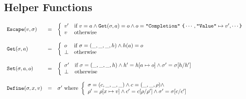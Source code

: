 \newpage


\subsection{Helper Functions}\label{sec:helper}

\[
  \begin{array}{lcl}
    \texttt{Escape}(v, \sigma) &=& \left\{
      \begin{array}{ll}
        v' & \text{if}\
        v = a \wedge
        \texttt{Get}(\sigma, a) = o \wedge
        o = \texttt{"Completion"}\ \texttt{\{} \cdots, \texttt{"Value"} \mapsto v', \cdots \texttt{\}}\\
        v & \text{otherwise}\\
      \end{array}
    \right.\\\\

    \texttt{Get}(\sigma, a) &=& \left\{
      \begin{array}{ll}
        o & \text{if}\
        \sigma = (\_, \_, \_, h) \wedge
        h(a) = o\\
        \bot & \text{otherwise}\\
      \end{array}
    \right.\\\\

    \texttt{Set}(\sigma, a, o) &=& \left\{
      \begin{array}{ll}
        \sigma' & \text{if}\
        \sigma = (\_, \_, \_, h) \wedge
        h' = h[a \mapsto o] \wedge
        \sigma' = \sigma[h / h']\\
        \bot & \text{otherwise}\\
      \end{array}
    \right.\\\\

    \texttt{Define}(\sigma, x, v) &=& \sigma'\ \text{where}\ \left\{
      \begin{array}{ll}
        \sigma = (c, \_, \_, \_) \wedge
        c = (\_, \_, \rho) \wedge\\
        \rho' = \rho[x \mapsto v] \wedge
        c' = c[\rho / \rho'] \wedge
        \sigma' = \sigma[c / c']\\
      \end{array}
    \right.\\\\


\end{array}\]
